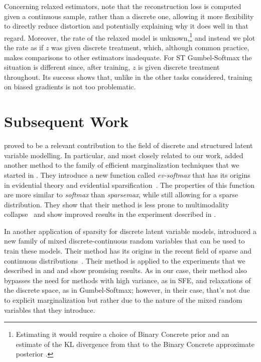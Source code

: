 Concerning relaxed estimators, note that the reconstruction loss is
computed given a continuous sample, rather than a discrete one,
allowing it more flexibility to directly reduce distortion and
potentially explaining why it does well in that regard. Moreover, the
rate of the relaxed model is unknown,\footnote{Estimating it would
    require a choice of Binary Concrete prior and an estimate of the KL
    divergence from that to the Binary Concrete approximate posterior
    \citep[Appendix C.3.2]{Concrete}.} and instead we plot the rate as if
$z$ was given discrete treatment, which, although common practice,
makes comparisons to other estimators inadequate. For ST
Gumbel-Softmax the situation is different since, after training, $z$
is given discrete treatment throughout. Its success shows that,
unlike in the other tasks considered, training on biased gradients is
not too problematic.

\section{Subsequent Work}
\label{sec:subsequent}

\citet{correia2020procneurips} proved to be a relevant
contribution to the field of discrete and structured latent variable
modelling. In particular, and most closely related to our work,
\citet{chen2021EvidentialSoftmaxSparse} added another method to the
family of efficient marginalization techniques that we started in
\citet{correia2020procneurips}. They introduce a new
function called \emph{ev-softmax} that has its origins in evidential
theory and evidential sparsification~\citep{itkina2020evidential}.
The properties of this function are more similar to \emph{softmax}
than \emph{sparsemax}, while still allowing for a sparse
distribution. They show that their method is less prone to
multimodality collapse~\citep{itkina2020evidential} and show improved
results in the experiment described in .

In another application of sparsity for discrete latent variable
models, \citet{farinhas2022SparseCommunicationMixed} introduced a new
family of mixed discrete-continuous random variables that can be used
to train these models. Their method has its origins in the recent
field of sparse and continuous
distributions~\citep{martins2020SparseContinuousAttention}. Their
method is applied to the experiments that we described in
 and  and show promising
results. As in our case, their method also bypasses the need for
methods with high variance, as in SFE, and relaxations of the
discrete space, as in Gumbel-Softmax; however, in their case, that's
not due to explicit marginalization but rather due to the nature of
the mixed random variables that they introduce.

